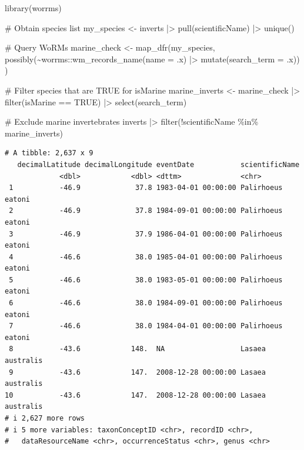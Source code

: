 \documentclass[
  letterpaper,
  DIV=11,
  numbers=noendperiod,
  oneside]{scrreprt}
\newenvironment{Shaded}{\begin{snugshade}}{\end{snugshade}}
\newcommand{\AttributeTok}[1]{\textcolor[rgb]{0.40,0.45,0.13}{#1}}
\newcommand{\CommentTok}[1]{\textcolor[rgb]{0.37,0.37,0.37}{#1}}
\newcommand{\ConstantTok}[1]{\textcolor[rgb]{0.56,0.35,0.01}{#1}}
\newcommand{\FunctionTok}[1]{\textcolor[rgb]{0.28,0.35,0.67}{#1}}
\newcommand{\NormalTok}[1]{\textcolor[rgb]{0.00,0.23,0.31}{#1}}
\newcommand{\OtherTok}[1]{\textcolor[rgb]{0.00,0.23,0.31}{#1}}
\newcommand{\SpecialCharTok}[1]{\textcolor[rgb]{0.37,0.37,0.37}{#1}}
\begin{document}
\begin{Shaded}
\begin{Highlighting}[]
\FunctionTok{library}\NormalTok{(worrms)}

\CommentTok{\# Obtain species list}
\NormalTok{my\_species }\OtherTok{\textless{}{-}}\NormalTok{ inverts }\SpecialCharTok{|\textgreater{}} 
  \FunctionTok{pull}\NormalTok{(scientificName) }\SpecialCharTok{|\textgreater{}}
  \FunctionTok{unique}\NormalTok{()}

\CommentTok{\# Query WoRMs}
\NormalTok{marine\_check }\OtherTok{\textless{}{-}} \FunctionTok{map\_dfr}\NormalTok{(my\_species,}
       \FunctionTok{possibly}\NormalTok{(}\SpecialCharTok{\textasciitilde{}}\NormalTok{worrms}\SpecialCharTok{::}\FunctionTok{wm\_records\_name}\NormalTok{(}\AttributeTok{name =}\NormalTok{ .x) }\SpecialCharTok{|\textgreater{}} \FunctionTok{mutate}\NormalTok{(}\AttributeTok{search\_term =}\NormalTok{ .x))}
\NormalTok{)}

\CommentTok{\# Filter species that are TRUE for isMarine}
\NormalTok{marine\_inverts }\OtherTok{\textless{}{-}}\NormalTok{ marine\_check }\SpecialCharTok{|\textgreater{}} 
  \FunctionTok{filter}\NormalTok{(isMarine }\SpecialCharTok{==} \ConstantTok{TRUE}\NormalTok{) }\SpecialCharTok{|\textgreater{}} 
  \FunctionTok{select}\NormalTok{(search\_term)}

\CommentTok{\# Exclude marine invertebrates}
\NormalTok{inverts }\SpecialCharTok{|\textgreater{}} \FunctionTok{filter}\NormalTok{(}\SpecialCharTok{!}\NormalTok{scientificName }\SpecialCharTok{\%in\%}\NormalTok{ marine\_inverts)}
\end{Highlighting}
\end{Shaded}

\begin{verbatim}
# A tibble: 2,637 x 9
   decimalLatitude decimalLongitude eventDate           scientificName   
             <dbl>            <dbl> <dttm>              <chr>            
 1           -46.9             37.8 1983-04-01 00:00:00 Palirhoeus eatoni
 2           -46.9             37.8 1984-09-01 00:00:00 Palirhoeus eatoni
 3           -46.9             37.9 1986-04-01 00:00:00 Palirhoeus eatoni
 4           -46.6             38.0 1985-04-01 00:00:00 Palirhoeus eatoni
 5           -46.6             38.0 1983-05-01 00:00:00 Palirhoeus eatoni
 6           -46.6             38.0 1984-09-01 00:00:00 Palirhoeus eatoni
 7           -46.6             38.0 1984-04-01 00:00:00 Palirhoeus eatoni
 8           -43.6            148.  NA                  Lasaea australis 
 9           -43.6            147.  2008-12-28 00:00:00 Lasaea australis 
10           -43.6            147.  2008-12-28 00:00:00 Lasaea australis 
# i 2,627 more rows
# i 5 more variables: taxonConceptID <chr>, recordID <chr>,
#   dataResourceName <chr>, occurrenceStatus <chr>, genus <chr>
\end{verbatim}
\end{document}
